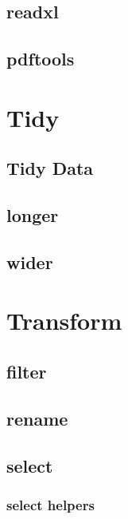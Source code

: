 \documentclass[
  12pt,
]{book}
\begin{document}
\hypertarget{readxl}{%
\section{readxl}\label{readxl}}

\hypertarget{pdftools}{%
\section{pdftools}\label{pdftools}}

\hypertarget{tidy-2}{%
\chapter{Tidy}\label{tidy-2}}

\hypertarget{tidy-data}{%
\section{Tidy Data}\label{tidy-data}}

\hypertarget{longer}{%
\section{longer}\label{longer}}

\hypertarget{wider}{%
\section{wider}\label{wider}}

\hypertarget{transform-2}{%
\chapter{Transform}\label{transform-2}}

\hypertarget{filter}{%
\section{filter}\label{filter}}

\hypertarget{rename}{%
\section{rename}\label{rename}}

\hypertarget{select}{%
\section{select}\label{select}}

\hypertarget{select-helpers}{%
\subsection{select helpers}\label{select-helpers}}
\end{document}
